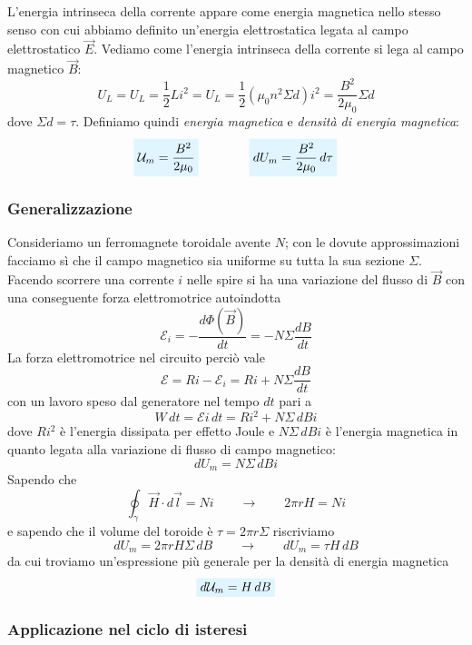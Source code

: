\documentclass[x11names]{report}
\begin{document}
L'energia intrinseca della corrente appare come energia magnetica nello stesso senso con cui abbiamo definito un'energia elettrostatica legata al campo elettrostatico \(\vec{E}\). Vediamo come l'energia intrinseca della corrente si lega al campo magnetico \(\vec{B}\):
\[
U_L = U_L = \frac{1}{2}Li^2 = U_L = \frac{1}{2}\left(\mu_0 n^2 \Sigma d\right)i^2 = \frac{B^2}{2\mu_0}\Sigma d
\]
dove \(\Sigma d = \tau\). Definiamo quindi \textit{energia magnetica} e \textit{densità di energia magnetica}:
\begin{equation}
	 \viola{\mathcal{U}_m = \frac{B^2}{2\mu_0}}\qquad \qquad \viola{dU_m = \frac{B^2}{2\mu_0} \, d\tau} 
\end{equation}


\subsubsection{Generalizzazione}
\begin{figure}
\end{figure}
Consideriamo un ferromagnete toroidale avente \(N\); con le dovute approssimazioni facciamo sì che il campo magnetico sia uniforme su tutta la sua sezione \(\Sigma\). Facendo scorrere una corrente \(i\) nelle spire si ha una variazione del flusso di \(\vec{B}\) con una conseguente forza elettromotrice autoindotta
\[
\mathcal{E}_i  =- \frac{d\Phi(\vec{B})}{dt} = -N\Sigma \frac{dB}{dt}
\]
La forza elettromotrice nel circuito perciò vale 
\[
\mathcal{E} = Ri - \mathcal{E}_i = Ri + N\Sigma \frac{dB}{dt}
\]
con un lavoro speso dal generatore nel tempo \(dt\) pari a 
\[
W \, dt = \mathcal{E}i \, dt = Ri^2 + N\Sigma \, dB i
\]
dove \(Ri^2\) è l'energia dissipata per effetto Joule e \(N\Sigma \, dB i\) è l'energia magnetica in quanto legata alla variazione di flusso di campo magnetico:
\[
dU_m = N\Sigma \, dB i
\]
Sapendo che
\[
\oint_\gamma \vec{H} \cdot d\vec{l} = Ni \qquad \to \qquad 2\pi r H = Ni 
\]
e sapendo che il volume del toroide è \(\tau = 2\pi r \Sigma\) riscriviamo
\[
dU_m = 2\pi r H \Sigma  \, dB  \qquad \to \qquad dU_m = \tau H \, dB
\]
da cui troviamo un'espressione più generale per la densità di energia magnetica
\begin{equation}
	\viola{d\mathcal{U}_m = H \, dB}
\end{equation}

\subsubsection{Applicazione nel ciclo di isteresi}
\end{document}
